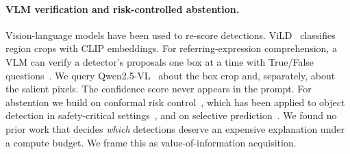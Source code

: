 \paragraph{VLM verification and risk-controlled abstention.}
Vision-language models have been used to re-score detections.
ViLD~\cite{gu2022vild} classifies region crops with CLIP embeddings. For
referring-expression comprehension, a VLM can verify a detector's proposals
one box at a time with True/False questions~\cite{vlmverify2025}. We query Qwen2.5-VL~\cite{bai2025qwen25vl} about the
box crop and, separately, about the salient pixels. The confidence score never
appears in the prompt.
For abstention we build on conformal risk control~\cite{angelopoulos2024crc},
which has been applied to object detection in safety-critical
settings~\cite{andeol2023conformal,andeol2025sequential}, and on selective
prediction~\cite{geifman2017selective,hendrycks2017baseline}. We found no prior
work that decides \emph{which} detections deserve an expensive explanation
under a compute budget. We frame this as value-of-information acquisition.
